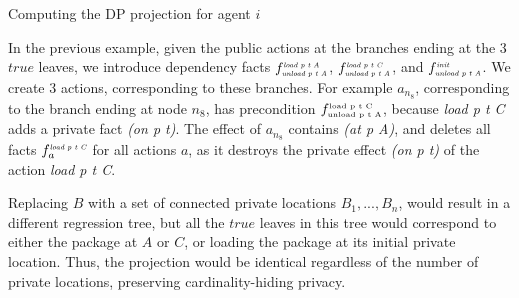 \documentclass[letterpaper]{article}
\theoremstyle{definition}
\newtheorem{example}{Example}[section]
\begin{document}
\begin{algorithm}[b!]
\small
\caption{Computing the DP projection for agent $i$} 
\label{alg:projection}
\end{algorithm}



In the previous example, given the public actions at the branches ending at the 3 $true$ leaves, we introduce dependency facts $f^{\tiny\mbox{{\em load p t A}}}_{\tiny\mbox{{\em unload p t A}}}$, $f^{\tiny\mbox{{\em load p t C}}}_{\tiny\mbox{{\em unload p t A}}}$, and $f^{\tiny\mbox{{\em init}}}_{\tiny\mbox{{\em unload p t A}}}$. We create 3 actions, corresponding to these branches. For example $a_{n_8}$, corresponding to the branch ending at node $n_8$, has precondition {\em $f^{\tiny\mbox{load p t C}}_{\tiny\mbox{unload p t A}}$}, because {\em load p t C} adds a private fact {\em (on p t)}. The effect of $a_{n_8}$ contains {\em (at p A)}, and deletes all facts $f^{\tiny\mbox{{\em load p t C}}}_a$ for all actions $a$, as it destroys the private effect {\em (on p t)} of the action {\em load p t C}.

Replacing $B$ with a set of connected private locations $B_1,...,B_n$, would result in a different regression tree, but all the $true$ leaves in this tree would correspond to either the package at $A$ or $C$, or loading the package at its initial private location. Thus, the projection would be identical regardless of the number of private locations, preserving cardinality-hiding privacy.
\end{document}
